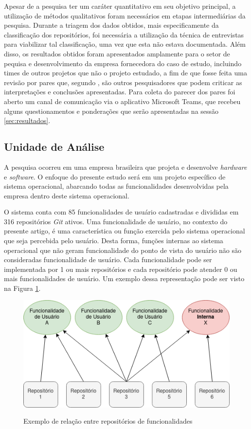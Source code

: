 \documentclass[11.5pt]{article}
\begin{document}
Apesar de a pesquisa ter um caráter quantitativo em seu objetivo principal, a utilização de métodos
qualitativos foram necessários em etapas intermediárias da pesquisa.
Durante a triagem dos dados obtidos, mais especificamente da classificação dos repositórios, foi
necessária a utilização da técnica de entrevistas para viabilizar tal classificação, uma vez que
esta não estava documentada.
Além disso, os resultados obtidos foram apresentados amplamente para o setor de pequisa e
desenvolvimento da empresa fornecedora do caso de estudo, incluindo times de outros projetos que não
o projeto estudado, a fim de que fosse feita uma revisão por pares que, segundo
\cite{metodosPesquisa}, são outros pesquisadores que podem criticar as interpretações e conclusões
apresentadas.
Para coleta do parecer dos pares foi aberto um canal de comunicação via o aplicativo Microsoft
Teams, que recebeu alguns questionamentos e ponderações que serão apresentadas na sessão
\ref{sec:resultados}.


\subsection{Unidade de Análise} \label{Unidade de Análise}

A pesquisa ocorreu em uma empresa brasileira que projeta e desenvolve \textit{hardware} e
\textit{software}.
O enfoque do presente estudo será em um projeto específico de sistema operacional, abarcando todas
as funcionalidades desenvolvidas pela empresa dentro deste sistema operacional.

O sistema conta com 85 funcionalidades de usuário cadastradas e divididas em 316 repositórios
\textit{Git} ativos.
Uma funcionalidade de usuário, no contexto do presente artigo, é uma característica ou função
exercida pelo sistema operacional que seja percebida pelo usuário.
Desta forma, funções internas ao sistema operacional que não geram funcionalidade do ponto de vista
do usuário não são consideradas funcionalidade de usuário.
Cada funcionalidade pode ser implementada por 1 ou mais repositórios e cada repositório pode atender
0 ou mais funcionalidades de usuário. Um exemplo dessa representação pode ser visto na Figura
\ref{fig:features_repos}.

\begin{figure}[ht]
    \centering
    \includegraphics[width=.7\textwidth]{features_repos.png}
    \label{fig:features_repos}
    \caption{Exemplo de relação entre repositórios de funcionalidades}
\end{figure}
\end{document}

